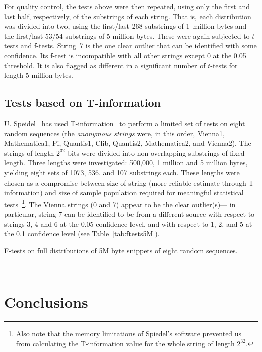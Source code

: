 \documentclass[10pt]{article}%
\begin{document}
For quality control, the tests above were then repeated, using only the first and last half, respectively, of the substrings of each string. That is, each distribution was divided into two, using the first/last 268 substrings of 1~million bytes and the first/last 53/54 substrings of 5 million bytes. These were again subjected to $t$-tests and f-tests. String~7 is the one clear outlier that can be identified with some confidence. Its f-test is incompatible with all other strings except 0 at the 0.05 threshold. It is also flagged as different in a significant number of $t$-tests for length 5 million bytes.
\fi

\subsection{Tests based on T-information}
U. Speidel~\cite{Speidel} has used T-information~\cite{titchener-96}
to perform a limited set
of tests on eight random sequences (the \emph{anonymous strings}
were, in this order, Vienna1, Mathematica1, Pi, Quantis1, Clib,
Quantis2, Mathematica2, and Vienna2).  The strings of length $2^{32}$
bits were divided into non-overlapping substrings of fixed
length. Three lengths were investigated: 500,000, 1 million and 5
million bytes, yielding eight sets of 1073, 536, and 107 substrings
each. These lengths were chosen as a compromise between size of
string (more reliable estimate through T-information) and size of
sample population required for meaningful statistical
tests~\footnote{Also note that the
memory limitations of Spiedel's software prevented us from
calculating the T-information value for the whole string of length
$2^{32}$.}. The Vienna
strings (0 and 7) appear to be the clear outlier(s)---
in particular, string 7 can be identified to be from a different source
with respect to strings 3, 4 and 6 at the 0.05 confidence level, and with
respect to 1, 2, and 5 at the 0.1 confidence level  (see
Table~\ref{tab:ftests5M}).

\begin{table}[ht]
\caption{F-tests on full distributions of 5M byte snippets of eight random
sequences.}\label{tab:ftests5M}

\

\centerline{}
\end{table}
\fi

\section{Conclusions}
\end{document}
